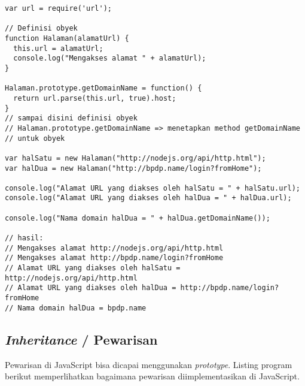 \lstset{language=JavaScript,caption=Definisi obyek di JavaScript}
\begin{lstlisting}
var url = require('url');

// Definisi obyek
function Halaman(alamatUrl) {
  this.url = alamatUrl;
  console.log("Mengakses alamat " + alamatUrl);
}

Halaman.prototype.getDomainName = function() {
  return url.parse(this.url, true).host; 
}
// sampai disini definisi obyek
// Halaman.prototype.getDomainName => menetapkan method getDomainName
// untuk obyek

var halSatu = new Halaman("http://nodejs.org/api/http.html");
var halDua = new Halaman("http://bpdp.name/login?fromHome");

console.log("Alamat URL yang diakses oleh halSatu = " + halSatu.url);
console.log("Alamat URL yang diakses oleh halDua = " + halDua.url);

console.log("Nama domain halDua = " + halDua.getDomainName());

// hasil:
// Mengakses alamat http://nodejs.org/api/http.html
// Mengakses alamat http://bpdp.name/login?fromHome
// Alamat URL yang diakses oleh halSatu = http://nodejs.org/api/http.html
// Alamat URL yang diakses oleh halDua = http://bpdp.name/login?fromHome
// Nama domain halDua = bpdp.name
\end{lstlisting}

\subsection{\textit{Inheritance} / Pewarisan}

Pewarisan di JavaScript bisa dicapai menggunakan \textit{prototype}. Listing program berikut memperlihatkan bagaimana pewarisan diimplementasikan di JavaScript.

